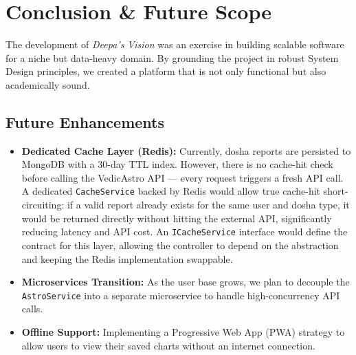 \documentclass[12pt,a4paper]{article}
\begin{document}
\section{Conclusion \& Future Scope}
The development of \textit{Deepa's Vision} was an exercise in building scalable software for a niche but data-heavy domain. By grounding the project in robust System Design principles, we created a platform that is not only functional but also academically sound.

\subsection{Future Enhancements}
\begin{itemize}
    \item \textbf{Dedicated Cache Layer (Redis):} Currently, dosha reports are persisted to MongoDB with a 30-day TTL index. However, there is no cache-hit check before calling the VedicAstro API --- every request triggers a fresh API call. A dedicated \texttt{CacheService} backed by Redis would allow true cache-hit short-circuiting: if a valid report already exists for the same user and dosha type, it would be returned directly without hitting the external API, significantly reducing latency and API cost. An \texttt{ICacheService} interface would define the contract for this layer, allowing the controller to depend on the abstraction and keeping the Redis implementation swappable.
    \item \textbf{Microservices Transition:} As the user base grows, we plan to decouple the \texttt{AstroService} into a separate microservice to handle high-concurrency API calls.
    \item \textbf{Offline Support:} Implementing a Progressive Web App (PWA) strategy to allow users to view their saved charts without an internet connection.
\end{itemize}
\end{document}
